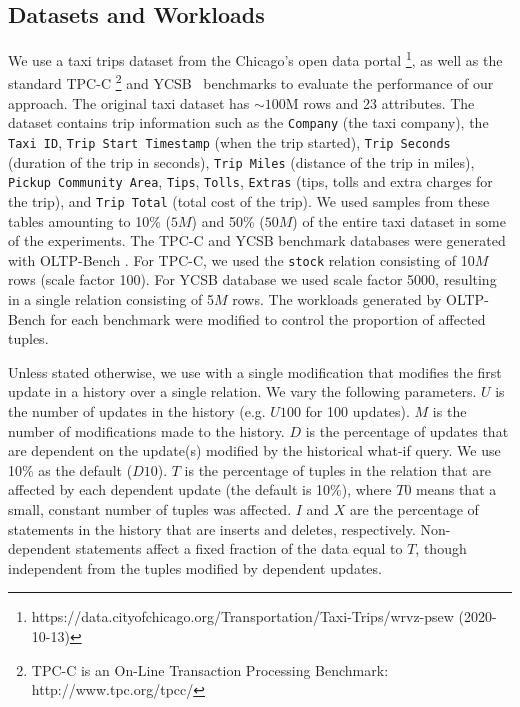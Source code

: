 \subsection{Datasets and Workloads}\label{sec:exp-data-and-workloads}
We use a taxi trips dataset from the Chicago's open data portal \footnote{https://data.cityofchicago.org/Transportation/Taxi-Trips/wrvz-psew (2020-10-13)}, as well as the standard TPC-C \footnote{TPC-C is an On-Line Transaction Processing Benchmark: http://www.tpc.org/tpcc/} and YCSB~\cite{CooperSTRS10} benchmarks to evaluate the performance of our approach. %
The original taxi dataset has $\sim100$M rows and 23 attributes.
The dataset contains trip information such as the \texttt{Company} (the taxi company), the \texttt{Taxi ID}, \texttt{Trip Start Timestamp}
(when the trip started), \texttt{Trip Seconds} (duration of the trip in seconds), \texttt{Trip Miles}
(distance of the trip in miles), \texttt{Pickup Community Area}, \texttt{Tips}, \texttt{Tolls}, \texttt{Extras} (tips, tolls and extra charges for the trip), and \texttt{Trip Total} (total cost of the trip).
%
%
%
%
%
%
We used samples from these tables amounting to 10\% ($5M$) and 50\% ($50M$) of the entire taxi dataset in some of the experiments. The TPC-C and YCSB benchmark databases were generated with OLTP-Bench \cite{DifallahPCC13}. For TPC-C, we used  the \texttt{stock} relation consisting of 10$M$ rows (scale factor 100).
 For YCSB database we used scale factor 5000, resulting in a single relation consisting of 5$M$ rows. The workloads generated by OLTP-Bench for each benchmark were modified to control the proportion of affected tuples.

%
%
%
%
%

%
%
%
%
Unless stated otherwise, we use \abbrHWs with a single modification that modifies the first update in a history over a single relation.
We vary the following parameters. $U$ is the number of updates in the history (e.g. $U100$ for 100 updates). %
$M$ is the number of modifications made to the history.
$D$ is the percentage of updates that are dependent on the update(s) modified by the historical what-if query. We use 10\% as the default  ($D10$).
%
$T$ is the percentage of tuples in the relation that are affected by each dependent update (the default is 10\%), where $T0$ means that a small, constant number of tuples was affected. $I$ and $X$ are the percentage of statements in the history that are inserts and deletes, respectively.
% 
Non-dependent statements affect a fixed fraction of the data equal to $T$, though independent from the tuples modified by dependent updates. %
%



